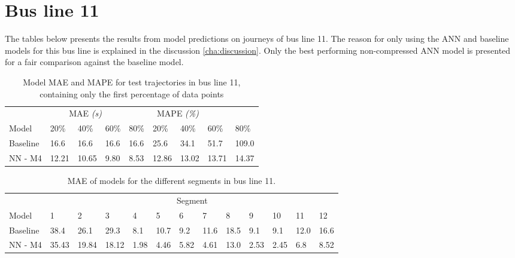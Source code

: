 \section{Bus line 11}
The tables below presents the results from model predictions on journeys of bus line 11. The reason for only using the ANN and baseline models for this bus line is explained in the discussion \ref{cha:discussion}. Only the best performing non-compressed ANN model is presented for a fair comparison against the baseline model.
\begin{table}[H]
	\centering
	\caption{Model MAE and MAPE for test trajectories in bus line 11, containing only the first percentage of data points}
	\label{tbl:models-mae-and-mape-211}
	\begin{tabular}{l | l | l | l | l || l | l | l | l }
		& \multicolumn{3}{c}{MAE \textit{(s)}} & \multicolumn{4}{c}{MAPE \textit{(\%)}} \\
		Model      & 20\% & 40\% & 60\% & 80\% & 20\% & 40\% & 60\% & 80\% \\
		\hline
		Baseline & 16.6 & 16.6 & 16.6 & 16.6  & 25.6 & 34.1 & 51.7 & 109.0 \\
		NN - M4        & 12.21 &  10.65 & 9.80 &  8.53  & 12.86 & 13.02 & 13.71 & 14.37 \\
	\end{tabular}
\end{table}

\begin{table}[H]
	\centering
	\caption{MAE of models for the different segments in bus line 11.}
	\label{tbl:model-mae-of-segs-211}
	\begin{adjustbox}{center}
	\begin{tabular}{ l | l | l | l | l | l | l | l | l | l | l | l | l}
		& \multicolumn{12}{c}{Segment} \\
		Model       & 1 & 2 & 3 & 4 & 5 & 6 & 7 & 8 & 9 & 10 & 11 & 12 \\
		\hline
		Baseline  & 38.4 & 26.1 & 29.3 & 8.1 & 10.7 & 9.2 & 11.6 & 18.5 & 9.1 & 9.1  & 12.0 & 16.6 \\
		NN - M4         & 35.43& 19.84& 18.12& 1.98& 4.46& 5.82& 4.61& 13.0& 2.53& 2.45& 6.8& 8.52\\
	\end{tabular}
	\end{adjustbox}
\end{table}

